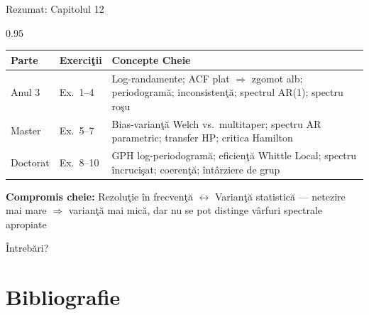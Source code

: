 \documentclass[9pt, aspectratio=169, t]{beamer}
\begin{document}
\begin{frame}{Rezumat: Capitolul 12}
    \begin{cminipage}{0.95\textwidth}
    {\footnotesize
    \begin{center}
    \begin{tabular}{p{2.2cm}p{2.5cm}p{7.5cm}}
        \toprule
        \textbf{Parte} & \textbf{Exerciţii} & \textbf{Concepte Cheie} \\
        \midrule
        Anul 3 & Ex.\ 1--4 & Log-randamente; ACF plat $\Rightarrow$ zgomot alb; periodogramă; inconsistenţă; spectrul AR(1); spectru roşu \\[4pt]
        Master & Ex.\ 5--7 & Bias-varianţă Welch vs.\ multitaper; spectru AR parametric; transfer HP; critica Hamilton \\[4pt]
        Doctorat & Ex.\ 8--10 & GPH log-periodogramă; eficienţă Whittle Local; spectru încrucişat; coerenţă; întârziere de grup \\
        \bottomrule
    \end{tabular}
    \end{center}

    {\scriptsize \textbf{Compromis cheie:} Rezoluţie în frecvenţă $\longleftrightarrow$ Varianţă statistică --- netezire mai mare $\Rightarrow$ varianţă mai mică, dar nu se pot distinge vârfuri spectrale apropiate}
    }

    \vspace{0.2cm}
    \begin{center}
        \Large\textcolor{MainBlue}{Întrebări?}
    \end{center}
    \end{cminipage}
\end{frame}

\section{Bibliografie}
\end{document}
